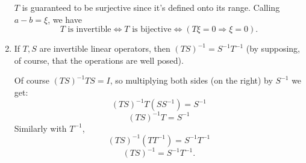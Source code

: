 \documentclass{article}
\theoremstyle{remark}
\newenvironment{exercise}[1]
  {\renewcommand\theinnerex{#1}\innerex}
  {\endinnerex}
\begin{document}
\begin{exercise}{1.1.5}
\begin{enumerate}
              $T$ is guaranteed to be surjective since it's defined onto its range. Calling $a-b = \xi$, we have
              $$ T \text{ is invertible} \Leftrightarrow T \text{ is bijective} \Leftrightarrow (T\xi = 0 \Rightarrow \xi = 0). $$

        \item  If $T, S$ are invertible linear operators, then $(T S)^{-1} = S^{-1} T^{-1}$ (by supposing,
              of course, that the operations are well posed).

              Of course $(T S)^{-1} TS = I$, so multiplying both sides (on the right) by $S^{-1}$ we get:
              $$ (T S)^{-1} T(S S^{-1}) = S^{-1} $$
              $$ (T S)^{-1} T = S^{-1} $$
              Similarly with $T^{-1}$,
              $$ (T S)^{-1}(T T^{-1}) = S^{-1}T^{-1}$$
              $$ (T S)^{-1} = S^{-1}T^{-1}.$$

    \end{enumerate}

\end{exercise}
\end{document}
